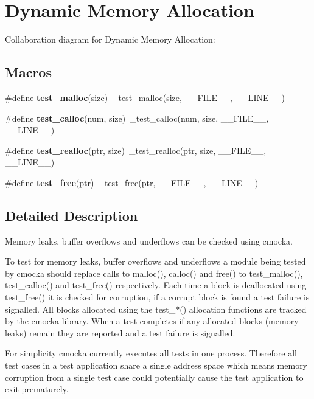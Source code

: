 \hypertarget{group__cmocka__alloc}{}\section{Dynamic Memory Allocation}
\label{group__cmocka__alloc}
Collaboration diagram for Dynamic Memory Allocation\+:
\subsection*{Macros}
\begin{DoxyCompactItemize}
\item 
\mbox{\label{group__cmocka__alloc_gabc8968063b748336a76111930e0bf31d}} 
\#define {\bfseries test\+\_\+malloc}(size)~\+\_\+test\+\_\+malloc(size, \+\_\+\+\_\+\+F\+I\+L\+E\+\_\+\+\_\+, \+\_\+\+\_\+\+L\+I\+N\+E\+\_\+\+\_\+)
\item 
\mbox{\label{group__cmocka__alloc_ga02b206ae46eca6b6edd38fbc7de50cba}} 
\#define {\bfseries test\+\_\+calloc}(num,  size)~\+\_\+test\+\_\+calloc(num, size, \+\_\+\+\_\+\+F\+I\+L\+E\+\_\+\+\_\+, \+\_\+\+\_\+\+L\+I\+N\+E\+\_\+\+\_\+)
\item 
\mbox{\label{group__cmocka__alloc_gadf150db9dfdc0479bc8792020472c1f1}} 
\#define {\bfseries test\+\_\+realloc}(ptr,  size)~\+\_\+test\+\_\+realloc(ptr, size, \+\_\+\+\_\+\+F\+I\+L\+E\+\_\+\+\_\+, \+\_\+\+\_\+\+L\+I\+N\+E\+\_\+\+\_\+)
\item 
\mbox{\label{group__cmocka__alloc_gaf73e539580781a60f70bff5cc58c023f}} 
\#define {\bfseries test\+\_\+free}(ptr)~\+\_\+test\+\_\+free(ptr, \+\_\+\+\_\+\+F\+I\+L\+E\+\_\+\+\_\+, \+\_\+\+\_\+\+L\+I\+N\+E\+\_\+\+\_\+)
\end{DoxyCompactItemize}


\subsection{Detailed Description}
Memory leaks, buffer overflows and underflows can be checked using cmocka.

To test for memory leaks, buffer overflows and underflows a module being tested by cmocka should replace calls to malloc(), calloc() and free() to test\+\_\+malloc(), test\+\_\+calloc() and test\+\_\+free() respectively. Each time a block is deallocated using test\+\_\+free() it is checked for corruption, if a corrupt block is found a test failure is signalled. All blocks allocated using the test\+\_\+$\ast$() allocation functions are tracked by the cmocka library. When a test completes if any allocated blocks (memory leaks) remain they are reported and a test failure is signalled.

For simplicity cmocka currently executes all tests in one process. Therefore all test cases in a test application share a single address space which means memory corruption from a single test case could potentially cause the test application to exit prematurely. 